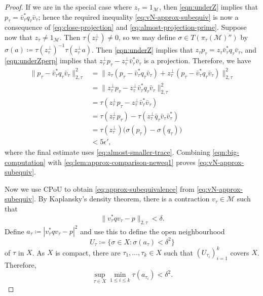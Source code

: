 \documentclass[a4paper,11pt]{amsart}
\theoremstyle{definition}
\numberwithin{equation}{section}
\numberwithin{theorem}{section}
\newcommand{\M}{\mathcal{M}}
\begin{document}
\begin{proof}
	
	If we are in the special case where $z_\tau = 1_\M$, then \eqref{eqn:underZ} implies that $p_\tau = \bar v_\tau^* q_\tau \bar v_\tau$; hence the required inequality \eqref{eq:vN-approx-subequiv} is now a consequence of \eqref{eq:close-projection} and \eqref{eq:almost-projection-prime}.
	Suppose now that $z_\tau \neq 1_\M$. Then $\tau(z_\tau^\perp) \neq 0$, so we may define $\sigma \in T(\pi_\tau(\M)'')$ by $\sigma(a) \coloneqq \tau(z_\tau^\perp)^{-1} \tau(z_\tau^\perp a)$.  Then \eqref{eqn:underZ} implies that $z_\tau p_\tau = z_\tau \bar v_\tau^* q_\tau \bar v_\tau$, and \eqref{eqn:underZperp} implies that $z_\tau^\perp p_\tau - z_\tau^\perp \bar v_\tau^* \bar v_\tau$ is a projection. 
	Therefore, we have
	\begin{equation}\begin{split}\label{eqn:big-computation}
		\|p_\tau -  \bar v_\tau^* q_\tau \bar v_\tau \|_{2, \tau}^2
		&= \|z_\tau(p_\tau - \bar v_\tau^* q_\tau \bar v_\tau) + z_\tau^\perp(p_\tau - \bar v_\tau^* q_\tau \bar v_\tau)\|_{2, \tau}^2  \\
		&= \|z_\tau^\perp p_\tau - z_\tau^\perp \bar v_\tau^* q_\tau \bar v_\tau\|_{2, \tau}^2  \\
		&= \tau(z_\tau^\perp p_\tau - z_\tau^\perp \bar v_\tau^* \bar v_\tau)  \\
		&= \tau(z_\tau^\perp p_\tau) - \tau(z_\tau^\perp \bar q_\tau \bar v_\tau \bar v_\tau^*)  \\
		&= \tau(z_\tau^\perp) \big(\sigma(p_\tau) - \sigma(q_\tau)\big)  \\
		&< 5 \epsilon',
	\end{split}\end{equation}
	where the final estimate uses  \eqref{eq:almost-smaller-trace}. 
	Combining \eqref{eqn:big-computation} with \eqref{eq:lem:approx-comparison-neweq1} proves \eqref{eq:vN-approx-subequiv}.
	
	Now we use CPoU to obtain \eqref{eq:approx-subequivalence} from \eqref{eq:vN-approx-subequiv}.  By Kaplansky's density theorem, there is a contraction $v_\tau \in \M$ such that
	\begin{equation}
		\| v_\tau^*q v_\tau - p \|_{2, \tau} < \delta.
	\end{equation}
	Define $a_\tau \coloneqq |v_\tau^* q v_\tau - p|^2$ and use this to define the open neighbourhood
	\begin{equation}
		U_\tau \coloneqq \{ \sigma \in X : \sigma(a_\tau) < \delta^2 \}
	\end{equation}
	of $\tau$ in $X$.  As $X$ is compact, there are $\tau_1, \ldots, \tau_k \in X$ such that $(U_{\tau_i})_{i=1}^k$ covers $X$.  Therefore,
	\begin{equation}
		\sup_{\tau \in X} \min_{1 \leq i \leq k} \tau(a_{\tau_i}) < \delta^2.
	\end{equation}
	

\end{proof}
\end{document}
